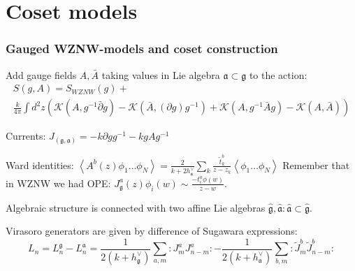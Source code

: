\documentclass[pdftex]{beamer}
\newcommand{\gf}{\mathfrak{g}}
\newcommand{\gfh}{\hat{\mathfrak{g}}}
\newcommand{\af}{\mathfrak{a}}
\newcommand{\afh}{\hat{\mathfrak{a}}}
\theoremstyle{definition} \newtheorem{Def}{Definition}
\begin{document}
\section{Coset models}
\label{sec:coset-models}

\begin{frame}
  \frametitle{Gauged WZNW-models and coset construction}
  Add gauge fields $A, \bar{A}$ taking values in Lie algebra $\af\subset \gf$ to the action:
  \begin{multline*}
    S(g,A)=S_{WZNW}(g)+\\
    \frac{k}{4\pi}\int d^{2}z \left(\mathcal{K}(A, g^{-1}\bar \partial g)-\mathcal{K}(\bar A, (\partial g ) g^{-1})+\mathcal{K}(A,g^{-1}\bar A g)-\mathcal{K}(A,\bar A)\right)
  \end{multline*}

  Currents:  $J_{(\gf,\af)}=-k\partial g g^{-1} -k g A g^{-1}$

  Ward identities:
  $   \left< A^{b}(z)\phi_{1}\dots \phi_{N}\right>=\frac{2}{k+2
    h^{\vee}_{\af}}\sum_{k}\frac{\tilde{t}^{b}_{k}}{z-z_{k}}\left<\phi_{1}\dots \phi_{N}\right>$ 
  Remember that in WZNW we had OPE: $J_{\gf}^{a}(z)\phi_{i}(w)\sim \frac{-t^{a}_{i}\phi(w)}{z-w}$.

  Algebraic structure is connected with two affine Lie algebras $\gfh, \afh: \afh\subset\gfh$. 

 Virasoro generators are given by difference of Sugawara expressions:
  \begin{equation*}
    L_{n}=L_{n}^{\gf}-L_{n}^{\af}=\frac{1}{2(k+h^{\vee}_{\gf})}\sum\limits_{a,m}:J^a_m J^a_{n-m}: - \frac{1}{2(k+h^{\vee}_{\af})}\sum\limits_{b,m}:\tilde{J}^b_m \tilde{J}^b_{n-m}:
  \end{equation*}

\end{frame}
\end{document}
